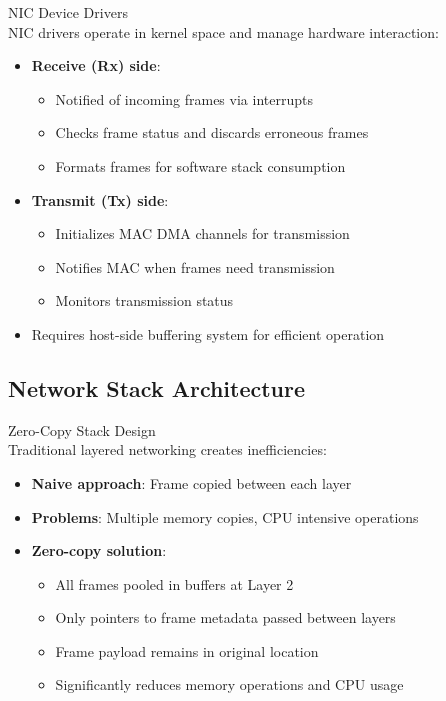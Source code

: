 \begin{theorem}{NIC Device Drivers}\\
    NIC drivers operate in kernel space and manage hardware interaction:
    \begin{itemize}
        \item \textbf{Receive (Rx) side}:
            \begin{itemize}
                \item Notified of incoming frames via interrupts
                \item Checks frame status and discards erroneous frames
                \item Formats frames for software stack consumption
            \end{itemize}
        \item \textbf{Transmit (Tx) side}:
            \begin{itemize}
                \item Initializes MAC DMA channels for transmission
                \item Notifies MAC when frames need transmission
                \item Monitors transmission status
            \end{itemize}
        \item Requires host-side buffering system for efficient operation
    \end{itemize}
\end{theorem}

\multend

\subsection{Network Stack Architecture}


\begin{concept}{Zero-Copy Stack Design}\\
    Traditional layered networking creates inefficiencies:
    \begin{itemize}
        \item \textbf{Naive approach}: Frame copied between each layer
        \item \textbf{Problems}: Multiple memory copies, CPU intensive operations
        \item \textbf{Zero-copy solution}:
            \begin{itemize}
                \item All frames pooled in buffers at Layer 2
                \item Only pointers to frame metadata passed between layers
                \item Frame payload remains in original location
                \item Significantly reduces memory operations and CPU usage
            \end{itemize}
    \end{itemize}
\end{concept}

